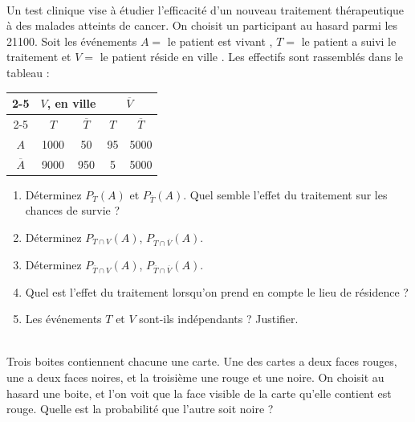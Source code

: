 \documentclass[main.tex]{subfiles}
\begin{document}
\begin{problem} \hfill \\
	Un test clinique vise à étudier l'efficacité d'un nouveau traitement thérapeutique à des malades atteints de cancer. On choisit un participant au hasard parmi les 21100. Soit les événements 	$A  = $ \og le patient est vivant  \fg{}, $T =  $ \og le patient a suivi le traitement \fg{} et $V =  $ \og le patient réside en ville \fg{}. Les effectifs sont rassemblés dans le tableau : \\
		\begin{tabular}{|*5{c|}}
		\cline{2-5}
		\multicolumn{1}{c|}{\multirow{2}{*}{}} & \multicolumn{2}{c|}{$V$, en ville}  & \multicolumn{2}{c|}{$\overline{V}$  } \\ \cline{2-5}
		\multicolumn{1}{c|}{}   &  $T$ &  $\overline{T}$   &$T$  & $\overline{T}$   \\ \hline
		   $A$  &  1000 & 50  & 95 &  5000  \\ \hline
		  $\overline{A}$  & 9000  &  950  & 5   & 5000    \\ \hline
	\end{tabular}
	
	 
	\begin{enumerate}[leftmargin=*, label=\arabic*)]
		\item Déterminez $P_T(A)$ et $P_{\overline{T}}(A)$.   Quel semble l'effet du traitement sur les chances de survie ?
		\item Déterminez  $P_{T\cap V}(A)$, $P_{T\cap \overline{V}}(A)$.
		\item Déterminez $P_{\overline{T}\cap V}(A)$, $P_{\overline{T}\cap \overline{V}}(A)$. 
		\item Quel est l'effet du traitement  lorsqu'on prend en compte le lieu de résidence ? 
		\item Les événements $T$ et $V$ sont-ils indépendants ? Justifier.
	\end{enumerate} 
\end{problem} 
\begin{problem} \hfill \\
	Trois boites contiennent chacune une carte. Une des cartes a deux faces rouges, une a deux faces noires, et la troisième une rouge et une noire. On choisit au hasard une boite, et l'on    voit que la face visible de la carte qu'elle contient est rouge. Quelle est la probabilité que l'autre soit noire ?
\end{problem} 
\end{document}
